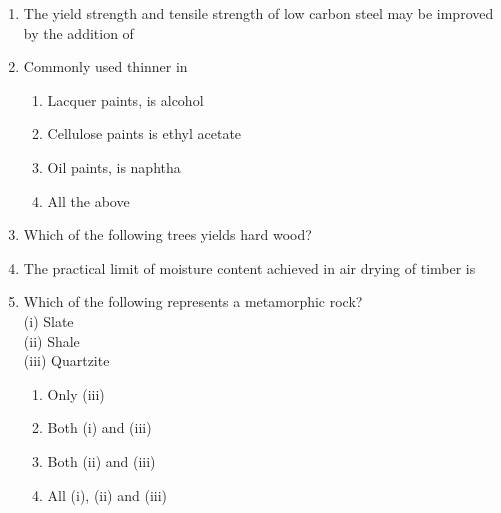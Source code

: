\documentclass[11pt,a4paper]{article}
\begin{document}
\begin{enumerate}
\item{The yield strength and tensile strength of low carbon steel may be improved by the addition of}
\\
\item{Commonly used thinner in}
\begin{enumerate}[label=\Alph*.]
\item{Lacquer paints, is alcohol}
\item{Cellulose paints is ethyl acetate}
\item{Oil paints, is naphtha}
\item{All the above}
\end{enumerate}
\item{Which of the following trees yields hard wood?}
\\
\item{The practical limit of moisture content achieved in air drying of timber is}
\\
\item{Which of the following represents a metamorphic rock? \\
 (i) Slate \\
 (ii) Shale \\
 (iii) Quartzite}
\begin{enumerate}[label=\Alph*.]
\item{Only (iii)}
\item{Both (i) and (iii)}
\item{Both (ii) and (iii)}
\item{All (i), (ii) and (iii)}
\end{enumerate}
\end{enumerate}
\end{document}

